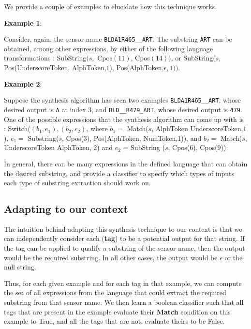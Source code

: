 We provide a couple of examples to elucidate how this technique works. 

{\bf Example 1}:

Consider, again, the sensor name \texttt{BLDA1R465\_\_ART}. The substring \texttt{ART} can be obtained, among other expressions, by either of the following language transformations :  SubString$(s, $ Cpos$(11)$, Cpos$(14))$, or SubString$(s,$ Pos(UnderscoreToken, AlphToken,$1$), Pos(AlphToken,$\epsilon, 1))$.

{\bf Example 2}: 

Suppose the synthesis algorithm has seen two examples \texttt{BLDA1R465\_\_ART}, whose desired output is \texttt{A} at index 3,  and \texttt{BLD\_\_R479\_ART}, whose desired output is \texttt{479}. One of the possible expressions that the synthesis algorithm can come up with is : Switch($(b_1, e_1), (b_2,e_2)$, where $b_1 =$ Match($s$, AlphToken UnderscoreToken,$1$), $e_1=$ Substring($s$, Cpos(3), Pos(AlphToken, NumToken,1)), and $b_2=$ Match($s$, UnderscoreToken AlphToken, 2) and $e_2$ = SubString ($s$, Cpos(6), Cpos(9)).

In general, there can be many expressions in the defined language that can obtain the desired substring, and provide a classifier to specify which types of inputs each type of substring extraction should work on.

%
%
%

\subsection{Adapting to our context}
\label{sec:adapt}

The intuition behind adapting this synthesis technique to our context is that we can independently consider each ({\bf tag}) to be a potential output for that string. If the tag can be applied to qualify a substring of the sensor name, then the output would be the required substring. In all other cases, the output would be $\epsilon$ or the null  string. 

Thus, for each given example and for each tag in that example, we can compute the set of all expressions from the language that could extract the required substring from that sensor name. We then learn a boolean classifier such that all tags that are present in the example evaluate their {\bf Match} condition on this example to True, and all the tags that are not, evaluate theirs to be False.

